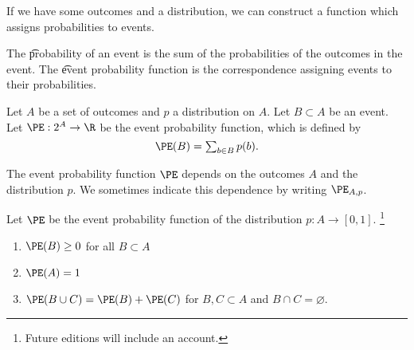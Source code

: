 

If we have some outcomes and a distribution, we can construct a function which assigns probabilities to events.


The \t{probability of an event} is the sum of the probabilities of the outcomes in the event.
The \t{event probability function} is the correspondence assigning events to their probabilities.


Let $A$ be a set of outcomes and $p$ a distribution on $A$.
Let $B \subset A$ be an event.
Let $\PE: 2^A \to \R $ be the event probability function, which is defined by
  \[
\textstyle
\PE(B) = \sum_{b \in B} p(b).
  \]

The event probability function $\PE$ depends on the outcomes $A$ and the distribution $p$.
We sometimes indicate this dependence by writing $\PE_{A, p}$.


\begin{prop}
Let $\PE$ be the event probability function of the distribution $p: A \to [0, 1]$.
  \ifhmode\unskip\fi\footnote{
Future editions will include an account.
  }
  \begin{enumerate}
  \item $\PE(B) \geq 0$ for all $B \subset A$
  \item $\PE(A) = 1$
  \item $\PE(B \cup C) = \PE(B) + \PE(C)$ for $B, C \subset A$ and $B \cap C = \varnothing$.
  \end{enumerate}
\end{prop}
